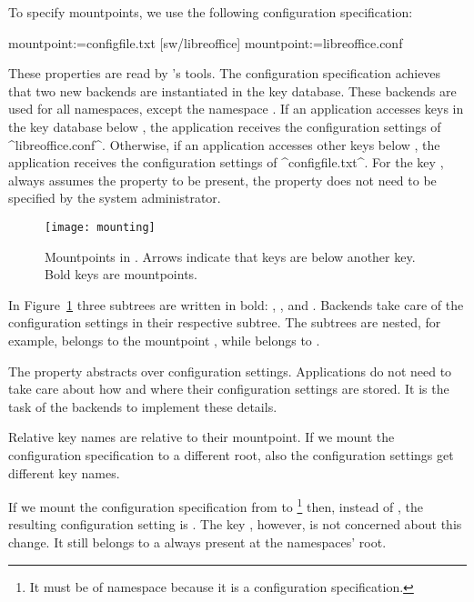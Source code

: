\begin{example}
\label{ex:mountpoint-specification}
To specify mountpoints, we use the following configuration specification:

\begin{code}
[sw]
  mountpoint:=configfile.txt
[sw/libreoffice]
  mountpoint:=libreoffice.conf
\end{code}

These properties are read by \elektra{}'s tools.
The configuration specification achieves that two new backends are instantiated in the key database.
These backends are used for all namespaces, except the namespace .
If an application accesses keys in the key database below , the application receives the configuration settings of ^libreoffice.conf^.
Otherwise, if an application accesses other keys below , the application receives the configuration settings of ^configfile.txt^.
For the key \key{/}, \elektra{} always assumes the property  to be present, the property does not need to be specified by the system administrator.

\begin{figure}[htp]
\centering
\texttt{[image: mounting]}
\caption[Mountpoints.]{Mountpoints in \elektra{}. Arrows indicate that keys are below another key.
Bold keys are mountpoints.}
\label{fig:mounting}
\end{figure}

In Figure~\ref{fig:mounting} three subtrees are written in bold: \key{/}, , and .\hspace{0.1em}
Backends take care of the configuration settings in their respective subtree.
The subtrees are nested, for example,  belongs to the mountpoint , while  belongs to .
\end{example}

The property  abstracts over configuration settings.
Applications do not need to take care about how and where their configuration settings are stored.
It is the task of the backends to implement these details.

Relative key names are relative to their mountpoint.
If we mount the configuration specification to a different root, also the configuration settings get different key names.

\begin{example}
\label{ex:mountpoint-specification-different-mountpoint}
If we mount the configuration specification from  to \footnote{It must be of namespace  because it is a configuration specification.} then, instead of , the resulting configuration setting is .
The key , however, is not concerned about this change.
It still belongs to a  always present at the namespaces' root.
\end{example}


